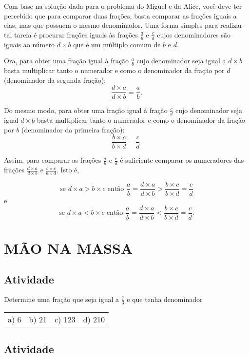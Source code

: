 \documentclass[a4,12pt]{book}
\begin{document}
Com base na solução dada para o problema do Miguel e da Alice, você deve ter percebido que para comparar duas frações, basta comparar as frações iguais a elas, mas que possuem o mesmo denominador. Uma forma simples para realizar tal tarefa é procurar frações iguais às frações  $\frac{a}{b}$ e $\frac{c}{d}$ cujos denominadores são iguais ao número $d\times b$ que é um múltiplo comum de $b$ e $d$.

Ora, para obter uma fração igual à fração $\frac{a}{b}$ cujo denominador seja igual a $d\times b$ basta multiplicar tanto o numerador e como o denominador da fração por $d$ (denominador da segunda fração):
$$\dfrac{d\times a}{d \times b} =  \dfrac{a}{b}.$$

Do mesmo modo, para obter uma fração igual à fração $\frac{c}{d}$ cujo denominador seja igual $d\times b$ basta multiplicar tanto o numerador e como o denominador da fração por $b$ (denominador da primeira fração):
$$\dfrac{b\times c}{b \times d} =  \dfrac{c}{d}.$$

Assim, para comparar as frações $\frac{a}{b}$ e $\frac{c}{d}$ é suficiente comparar os numeradores das frações  $\frac{d\times a}{d \times b}$ e $\frac{b\times c}{b \times d}$.
Isto é, 

$$\text{se } d\times a > b\times c \text{ então }  \dfrac{a}{b} = \dfrac{d\times a}{d \times b} >\dfrac{b\times c}{b \times d} =  \dfrac{c}{d}$$
e
$$\text{se } d\times a < b\times c \text{ então }  \dfrac{a}{b} = \dfrac{d\times a}{d \times b} < \dfrac{b\times c}{b \times d} =  \dfrac{c}{d}.$$


\section{MÃO NA MASSA }

\subsection{Atividade}

Determine uma fração que seja igual a $\frac{7}{3}$ e que tenha denominador

\begin{tabular}{m{}m{}m{}m{}}
 a) 6 & b) 21 & c) 123 & d) 210
\end{tabular}

\subsection{Atividade}
\end{document}
